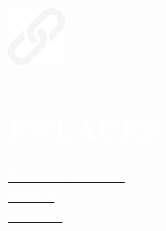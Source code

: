 \documentclass[../main.tex]{subfiles}
\begin{document}
    \hspace*{0.2cm}
    \begin{minipage}[t]{2.1cm}
        \vspace*{0.9cm}\includegraphics[width=1.5cm]{assets/link.png}
    \end{minipage}
    \begin{minipage}[t]{4.9cm}

        \vspace*{0.5cm}
        \section*{\textcolor{white}{ENLACES}}
        \vspace*{-0.25cm}
        \textcolor{white}{
            \vspace*{0.1cm}\underline{\href{https://albatalaya.github.io/}{\textcolor{white}{Portafolio Personal}}}\\
            \vspace*{0.1cm}\underline{\href{https://www.github.com/albatalaya}{\textcolor{white}{GitHub}}}\\
            \underline{\href{https://www.linkedin.com/in/albatalaya}{\textcolor{white}{LinkedIn}}}
        }
    \end{minipage}
\end{document}
